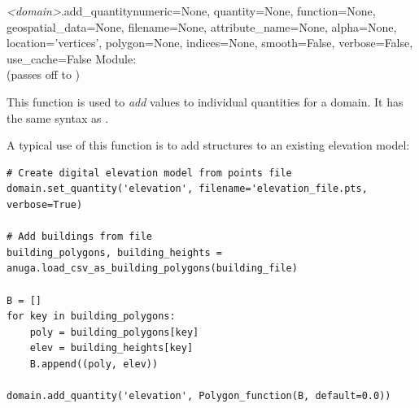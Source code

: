 \documentclass{manual}
\begin{document}
\begin{methoddesc}{\emph{<domain>}.add_quantity}{numeric=None,
                                                 quantity=None,
                                                 function=None,
                                                 geospatial_data=None,
                                                 filename=None,
                                                 attribute_name=None,
                                                 alpha=None,
                                                 location='vertices',
                                                 polygon=None,
                                                 indices=None,
                                                 smooth=False,
                                                 verbose=False,
                                                 use_cache=False}
Module:  \\
(passes off to )

\label{add quantity}
This function is used to \emph{add} values to individual quantities for a
domain. It has the same syntax as .

A typical use of this function is to add structures to an existing elevation model:

\begin{verbatim} 
# Create digital elevation model from points file
domain.set_quantity('elevation', filename='elevation_file.pts, verbose=True)

# Add buildings from file
building_polygons, building_heights = anuga.load_csv_as_building_polygons(building_file)

B = []
for key in building_polygons:
    poly = building_polygons[key]
    elev = building_heights[key]
    B.append((poly, elev))

domain.add_quantity('elevation', Polygon_function(B, default=0.0))
\end{verbatim}
\end{methoddesc}
\end{document}
